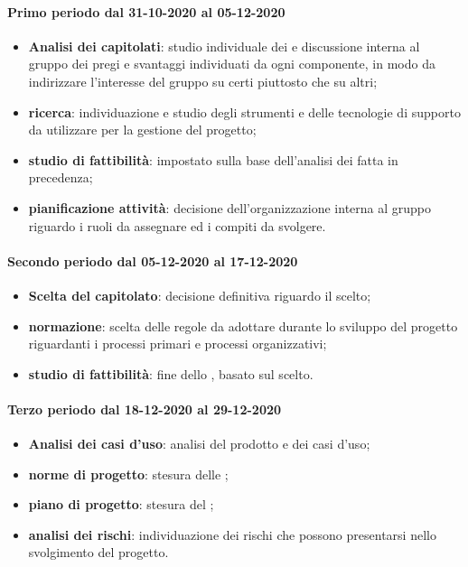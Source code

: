 \paragraph{Primo periodo dal 31-10-2020 al 05-12-2020} 
\begin{itemize} 
	\item \textbf{Analisi dei capitolati}: studio individuale dei  e discussione interna al gruppo dei pregi e svantaggi individuati da ogni componente, in modo da indirizzare l’interesse del gruppo su certi  piuttosto che su altri; 
	\item \textbf{ricerca}: individuazione e studio degli strumenti e delle tecnologie di supporto da utilizzare per la gestione del progetto; 
	\item \textbf{studio di fattibilità}: impostato sulla base dell'analisi dei  fatta in precedenza; 
	\item \textbf{pianificazione attività}: decisione dell'organizzazione interna al gruppo riguardo i ruoli da assegnare ed i compiti da svolgere. 
\end{itemize} 

\paragraph{Secondo periodo dal 05-12-2020 al 17-12-2020} 
\begin{itemize} 
	\item \textbf{Scelta del capitolato}: decisione definitiva riguardo il  scelto; 
	\item \textbf{normazione}: scelta delle regole da adottare durante lo sviluppo del progetto riguardanti i processi primari e processi organizzativi; 
	\item \textbf{studio di fattibilità}: fine dello , basato sul  scelto. 
\end{itemize} 

\paragraph{Terzo periodo dal 18-12-2020 al 29-12-2020} 
\begin{itemize} 
	\item \textbf{Analisi dei casi d'uso}: analisi del prodotto e dei casi d’uso; 
	\item \textbf{norme di progetto}: stesura delle ; 
	\item \textbf{piano di progetto}: stesura del ; 
	\item \textbf{analisi dei rischi}: individuazione dei rischi che possono presentarsi nello svolgimento del progetto. 
\end{itemize} 

